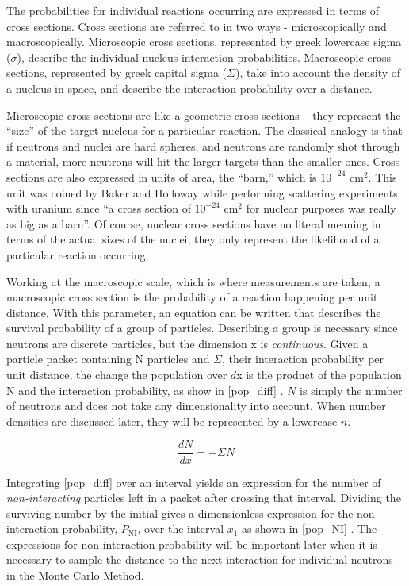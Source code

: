 The probabilities for individual reactions occurring are expressed in terms of cross sections.  Cross sections are referred to in two ways - microscopically and macroscopically.  Microscopic cross sections, represented by greek lowercase sigma ($\sigma$), describe the individual nucleus interaction probabilities.  Macroscopic cross sections, represented by greek capital sigma ($\Sigma$), take into account the density of a nucleus in space, and describe the interaction probability over a distance.  

Microscopic cross sections are like a geometric cross sections -- they represent the ``size'' of the target nucleus for a particular reaction.  The classical analogy is that if neutrons and nuclei are hard spheres, and neutrons are randomly shot through a material, more neutrons will hit the larger targets than the smaller ones.  Cross sections are also expressed in units of area, the ``barn,'' which is $10^{-24}$ cm$^2$.  This unit was coined by Baker and Holloway while performing scattering experiments with uranium since ``a cross section of $10^{-24}$ cm$^2$ for nuclear purposes was really as big as a barn''\cite{LAMS523}.  Of course, nuclear cross sections have no literal meaning in terms of the actual sizes of the nuclei, they only represent the likelihood of a particular reaction occurring.  

Working at the macroscopic scale, which is where measurements are taken, a macroscopic cross section is the probability of a reaction happening per unit distance.  With this parameter, an equation can be written that describes the survival probability of a group of particles.  Describing a group is necessary since neutrons are discrete particles, but the dimension x is \emph{continuous}.  Given a particle packet containing N particles and $\Sigma$, their interaction probability per unit distance, the change the population over $d$x is the product of the population N and the interaction probability, as show in \eqref{pop_diff} \cite{duderstadt}.  $N$ is simply the number of neutrons and does not take any dimensionality into account.  When number densities are discussed later, they will be represented by a lowercase $n$.

\begin{equation}
\frac{d N}{d x} = - \Sigma N
\label{pop_diff}
\end{equation}

Integrating \ref{pop_diff} over an interval yields an expression for the number of \emph{non-interacting} particles left in a packet after crossing that interval.  Dividing the surviving number by the initial gives a dimensionless expression for the non-interaction probability, $P_\mathrm{NI}$, over the interval $x_1$ as shown in \eqref{pop_NI} \cite{duderstadt}.  The expressions for non-interaction probability will be important later when it is necessary to sample the distance to the next interaction for individual neutrons in the Monte Carlo Method.

